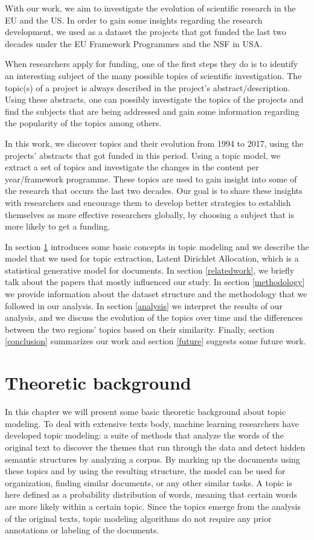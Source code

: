 \documentclass[12pt]{report}
\begin{document}
With our work, we aim to investigate the evolution of scientific
research in the EU and the US. In order to gain some insights  regarding
the research development, we used as a dataset the projects that got funded 
the last two decades under the EU Framework Programmes and the NSF in USA.

When researchers apply for funding, one of the first steps they do is
to identify an interesting subject of the many possible topics of
scientific investigation. The topic(s) of a project is always
described in the project's abstract/description. Using these abstracts, 
one can possibly investigate the topics of the projects and find the 
subjects that are being addressed and gain some information regarding 
the popularity of the topics among others.

In this work, we discover topics and their evolution from 1994 to
2017, using the projects' abstracts that got funded in this
period. Using a topic model, we extract a set of topics and
investigate the changes in the content per year/framework programme.
These topics are used to gain insight into some of the research that
occurs the last two decades. Our goal is to share these insights with
researchers and encourage them to develop better strategies to
establish themselves as more effective researchers globally, by
choosing a subject that is more likely to get a funding.

In section \ref{theoretic} introduces some basic concepts
in topic modeling and we describe the model that we used for topic
extraction, Latent Dirichlet Allocation, which is a statistical
generative model for documents. In section \ref{relatedwork}, 
we briefly talk about the papers that mostly influenced our study. 
In section \ref{methodology} we provide information
about the dataset structure and the methodology that we followed in
our analysis. In section \ref{analysis} we interpret the results of 
our analysis, and we discuss the evolution of the topics over time and the
differences between the two regions' topics based on their similarity.
Finally, section \ref{conclusion} summarizes our work and section 
\ref{future} suggests some future work.

\section{Theoretic background}
\label{theoretic}
In this chapter we will present some basic theoretic background about
topic modeling. To deal with extensive texts body, machine learning 
researchers have developed topic modeling:
a suite of methods that analyze the words of the original text to
discover the themes that run through the data and detect hidden
semantic structures by analyzing a corpus. By marking up the documents
using these topics and by using the resulting structure, the model can
be used for organization, finding similar documents, or any other
similar tasks. A topic is here defined as a probability distribution
of words, meaning that certain words are more likely within a certain
topic. Since the topics emerge from the analysis of the original
texts, topic modeling algorithms do not require any prior annotations
or labeling of the documents\cite{Blei11introductionto}.
\end{document}
